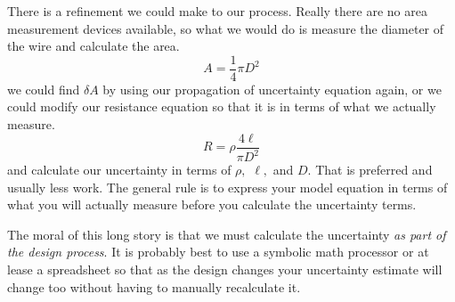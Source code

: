There is a refinement we could make to our process. Really there are no area
measurement devices available, so what we would do is measure the diameter
of the wire and calculate the area.%
\begin{equation*}
A=\frac{1}{4}\pi D^{2}
\end{equation*}%
we could find $\delta A$ by using our propagation of uncertainty equation
again, or we could modify our resistance equation so that it is in terms of
what we actually measure.%
\begin{equation*}
R=\rho \frac{4\ell }{\pi D^{2}}
\end{equation*}%
and calculate our uncertainty in terms of $\rho ,$ $\ell ,$ and $D.$ That is
preferred and usually less work. The general rule is to express your model
equation in terms of what you will actually measure before you calculate the
uncertainty terms.

The moral of this long story is that we must calculate the uncertainty \emph{%
as part of the design process}. It is probably best to use a symbolic math
processor or at lease a spreadsheet so that as the design changes your
uncertainty estimate will change too without having to manually recalculate
it.

\vspace*{\fill}%
\pagebreak

